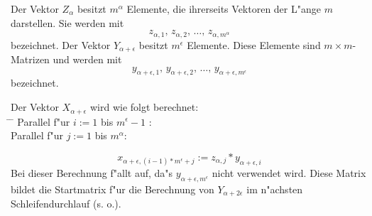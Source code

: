 \begin{itemize}
\begin{itemize}
            Der Vektor
            $Z_\alpha$ besitzt $m^\alpha$ Elemente, die ihrerseits Vektoren
            der L"ange $m$ darstellen. Sie werden mit
            \[
               z_{\alpha,1},\, z_{\alpha,2},\, \ldots,\, z_{\alpha,m^\alpha}
            \] bezeichnet.
            Der Vektor $Y_{\alpha+\epsilon}$ besitzt $m^\epsilon$
            Elemente. Diese Elemente sind $m \times m$-Matrizen und werden
            mit
            \[ y_{\alpha+\epsilon,1},\, y_{\alpha+\epsilon,2},\, \ldots,\,
               y_{\alpha+\epsilon,m^\epsilon}
            \] bezeichnet.
           
            \begin{tabbing}
                Der Vektor $X_{\alpha+\epsilon}$ wird wie folgt
                berechnet: \\
                    \hspace{1.5em} \= \hspace{1.5em} \= \kill 
                \> Parallel f"ur $i:= 1$ bis $m^\epsilon-1$ : \\
                \> \>  Parallel f"ur $j:= 1$ bis $m^\alpha$:
            \end{tabbing}
            \vspace{-4ex}
            \[
               x_{ \alpha+\epsilon,(i-1)*m^\epsilon+j}
                 := z_{\alpha,j} * y_{\alpha+\epsilon,i}
            \]
            Bei dieser Berechnung f"allt auf, da"s 
            $y_{\alpha+\epsilon,m^\epsilon}$ nicht verwendet wird. Diese 
            Matrix bildet die Startmatrix f"ur die Berechnung von
            $Y_{\alpha+2\epsilon}$ im n"achsten Schleifendurchlauf
            (s. o.).


\end{itemize}
\end{itemize}
